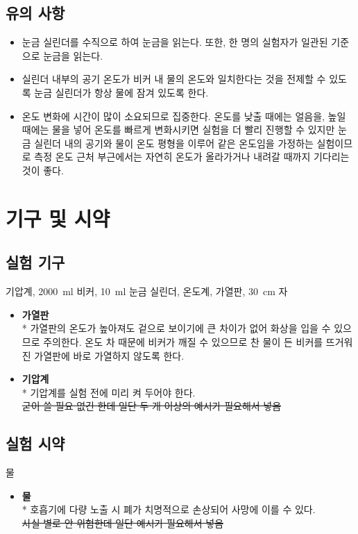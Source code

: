 \documentclass{GSHS-chemexp}
\begin{document}
	\subsection{유의 사항}
	\begin{itemize}
		\item 눈금 실린더를 수직으로 하여 눈금을 읽는다. 또한, 한 명의 실험자가 일관된 기준으로 눈금을 읽는다.
		\item 실린더 내부의 공기 온도가 비커 내 물의 온도와 일치한다는 것을 전제할 수 있도록 눈금 실린더가 항상 물에 잠겨 있도록 한다.
		\item 온도 변화에 시간이 많이 소요되므로 집중한다. 온도를 낮출 때에는 얼음을, 높일 때에는 물을 넣어 온도를 빠르게 변화시키면 실험을 더 빨리 진행할 수 있지만 눈금 실린더 내의 공기와 물이 온도 평형을 이루어 같은 온도임을 가정하는 실험이므로 측정 온도 근처 부근에서는 자연히 온도가 올라가거나 내려갈 때까지 기다리는 것이 좋다.
	\end{itemize}
	
	\section{기구 및 시약}
	
	\subsection{실험 기구}
	기압계, \SI{2000}{\milli\litre} 비커, \SI{10}{\milli\litre} 눈금 실린더, 온도계, 가열판, \SI{30}{\centi\metre} 자
	\begin{itemize}
		\item {\bf 가열판} \\*
		가열판의 온도가 높아져도 겉으로 보이기에 큰 차이가 없어 화상을 입을 수 있으므로 주의한다. 온도 차 때문에 비커가 깨질 수 있으므로 찬 물이 든 비커를 뜨거워진 가열판에 바로 가열하지 않도록 한다.
		\item {\bf 기압계} \\*
		기압계를 실험 전에 미리 켜 두어야 한다. \\
		\sout{굳이 쓸 필요 없긴 한데 일단 두 개 이상의 예시가 필요해서 넣음}
	\end{itemize}
	\subsection{실험 시약}
	물
	\begin{itemize}
		\item {\bf 물} \\*
		호흡기에 다량 노출 시 폐가 치명적으로 손상되어 사망에 이를 수 있다. \\
		\sout{사실 별로 안 위험한데 일단 예시가 필요해서 넣음}
	\end{itemize}
	
\end{document}
